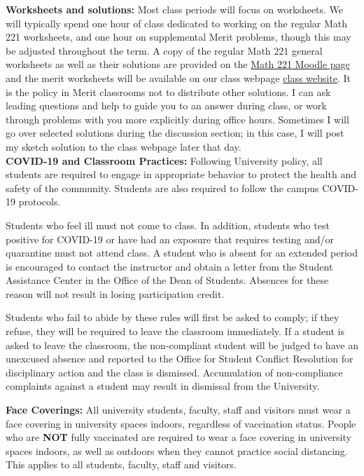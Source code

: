 \documentclass[12pt]{article}
\begin{document}
\noindent \textbf{Worksheets and solutions:} Most class periods will focus on worksheets. We will typically spend one hour of class dedicated to working on the regular Math 221 worksheets, and one hour on supplemental Merit problems, though this may be adjusted throughout the term. A copy of the regular Math 221 general worksheets as well as their solutions are provided on the \textcolor{blue}{\href{}{Math 221 Moodle page}} and the merit worksheets will be available on our class webpage \textcolor{blue}{\href{https://htrungvu.com/fall2021_calc1.html}{class website}}. It is the policy in Merit classrooms not to distribute other solutions. I can ask leading questions and help to guide you to an answer during class, or work through problems with you more explicitly during office hours. Sometimes I will go over selected solutions during the discussion section; in this case, I will post my sketch solution to the class webpage later that day.\\


\noindent \textbf{COVID-19 and Classroom Practices:} Following University policy, all students are required to engage in appropriate behavior to protect the health and safety of the community. Students are also required to follow the campus COVID-19 protocols.

Students who feel ill must not come to class. In addition, students who test positive for COVID-19 or have had an exposure that requires testing and/or quarantine must not attend class. A student who is absent for an extended period is encouraged to contact the instructor and obtain a letter from the Student Assistance Center in the Office of the Dean of Students. Absences for these reason will not result in losing participation credit.
   
Students who fail to abide by these rules will first be asked to comply; if they refuse, they will be required to leave the classroom immediately. If a student is asked to leave the classroom, the non-compliant student will be judged to have an unexcused absence and reported to the Office for Student Conflict Resolution for disciplinary action and the class is dismissed. Accumulation of non-compliance complaints against a student may result in dismissal from the University.

\textbf{Face Coverings:} All university students, faculty, staff and visitors must wear a face covering in university spaces indoors, regardless of vaccination status. People who are \textbf{NOT} fully vaccinated are required to wear a face covering in university spaces indoors, as well as outdoors when they cannot practice social distancing. This applies to all students, faculty, staff and visitors. 
	
\end{document}
